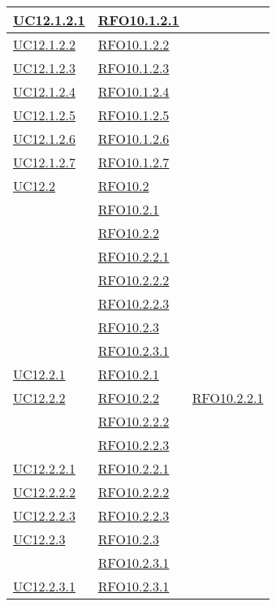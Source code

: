\begin{longtable}{|>{\centering}m{5cm}|m{5cm}<{\centering}|}
\hyperlink{UC12.1.2.1}{UC12.1.2.1} & \hyperlink{RFO10.1.2.1}{RFO10.1.2.1}\\\hline
\hyperlink{UC12.1.2.2}{UC12.1.2.2} & \hyperlink{RFO10.1.2.2}{RFO10.1.2.2}\\\hline
\hyperlink{UC12.1.2.3}{UC12.1.2.3} & \hyperlink{RFO10.1.2.3}{RFO10.1.2.3}\\\hline
\hyperlink{UC12.1.2.4}{UC12.1.2.4} & \hyperlink{RFO10.1.2.4}{RFO10.1.2.4}\\\hline
\hyperlink{UC12.1.2.5}{UC12.1.2.5} & \hyperlink{RFO10.1.2.5}{RFO10.1.2.5}\\\hline
\hyperlink{UC12.1.2.6}{UC12.1.2.6} & \hyperlink{RFO10.1.2.6}{RFO10.1.2.6}\\\hline
\hyperlink{UC12.1.2.7}{UC12.1.2.7} & \hyperlink{RFO10.1.2.7}{RFO10.1.2.7}\\\hline
\hyperlink{UC12.2}{UC12.2} & \hyperlink{RFO10.2}{RFO10.2}\\\hline
& \hyperlink{RFO10.2.1}{RFO10.2.1}\\
& \hyperlink{RFO10.2.2}{RFO10.2.2}\\
& \hyperlink{RFO10.2.2.1}{RFO10.2.2.1}\\
& \hyperlink{RFO10.2.2.2}{RFO10.2.2.2}\\
& \hyperlink{RFO10.2.2.3}{RFO10.2.2.3}\\
& \hyperlink{RFO10.2.3}{RFO10.2.3}\\
& \hyperlink{RFO10.2.3.1}{RFO10.2.3.1}\\\hline
\hyperlink{UC12.2.1}{UC12.2.1} & \hyperlink{RFO10.2.1}{RFO10.2.1}\\\hline
\hyperlink{UC12.2.2}{UC12.2.2} & \hyperlink{RFO10.2.2}{RFO10.2.2}
& \hyperlink{RFO10.2.2.1}{RFO10.2.2.1}\\
& \hyperlink{RFO10.2.2.2}{RFO10.2.2.2}\\
& \hyperlink{RFO10.2.2.3}{RFO10.2.2.3}\\\hline
\hyperlink{UC12.2.2.1}{UC12.2.2.1} & \hyperlink{RFO10.2.2.1}{RFO10.2.2.1}\\\hline
\hyperlink{UC12.2.2.2}{UC12.2.2.2} & \hyperlink{RFO10.2.2.2}{RFO10.2.2.2}\\\hline
\hyperlink{UC12.2.2.3}{UC12.2.2.3} & \hyperlink{RFO10.2.2.3}{RFO10.2.2.3}\\\hline
\hyperlink{UC12.2.3}{UC12.2.3} & \hyperlink{RFO10.2.3}{RFO10.2.3}\\
& \hyperlink{RFO10.2.3.1}{RFO10.2.3.1}\\\hline
\hyperlink{UC12.2.3.1}{UC12.2.3.1} & \hyperlink{RFO10.2.3.1}{RFO10.2.3.1}\\\hline

\end{longtable}
